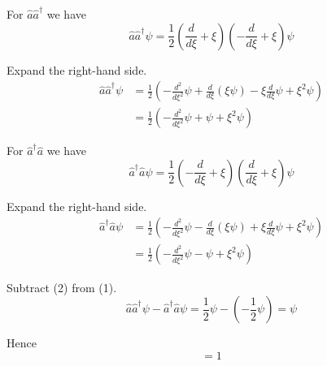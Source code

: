 


\bigskip
For $\hat a\hat a^\dag$ we have
\begin{equation*}
\hat a\hat a^\dag\psi=\frac{1}{2}\left(\frac{d}{d\xi}+\xi\right)\left(-\frac{d}{d\xi}+\xi\right)\psi
\end{equation*}

Expand the right-hand side.
\begin{align*}
\hat a\hat a^\dag\psi
&=\frac{1}{2}\left(-\frac{d^2}{d\xi^2}\psi+\frac{d}{d\xi}(\xi\psi)-\xi\frac{d}{d\xi}\psi+\xi^2\psi\right)
\\
&=\frac{1}{2}\left(-\frac{d^2}{d\xi^2}\psi+\psi+\xi^2\psi\right)
\tag{1}
\end{align*}

For $\hat a^\dag\hat a$ we have
\begin{equation*}
\hat a^\dag\hat a\psi=\frac{1}{2}\left(-\frac{d}{d\xi}+\xi\right)\left(\frac{d}{d\xi}+\xi\right)\psi
\end{equation*}

Expand the right-hand side.
\begin{align*}
\hat a^\dag\hat a\psi
&=\frac{1}{2}\left(-\frac{d^2}{d\xi^2}\psi-\frac{d}{d\xi}(\xi\psi)+\xi\frac{d}{d\xi}\psi+\xi^2\psi\right)
\\
&=\frac{1}{2}\left(-\frac{d^2}{d\xi^2}\psi-\psi+\xi^2\psi\right)
\tag{2}
\end{align*}

Subtract (2) from (1).
\begin{equation*}
\hat a\hat a^\dag\psi-\hat a^\dag\hat a\psi=\frac{1}{2}\psi-\left(-\frac{1}{2}\psi\right)=\psi
\end{equation*}

Hence
\begin{equation*}
[\hat a,\hat a^\dag]=1
\end{equation*}


